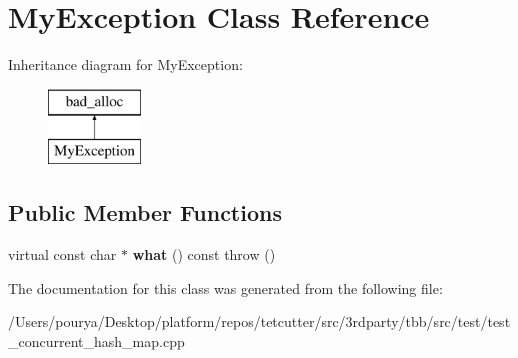 \hypertarget{classMyException}{}\section{My\+Exception Class Reference}
\label{classMyException}
Inheritance diagram for My\+Exception\+:\begin{figure}[H]
\begin{center}
\leavevmode
\includegraphics[height=2.000000cm]{classMyException}
\end{center}
\end{figure}
\subsection*{Public Member Functions}
\begin{DoxyCompactItemize}
\item 
\hypertarget{classMyException_a5f16510641895640d4651f0dec6962a4}{}virtual const char $\ast$ {\bfseries what} () const   throw ()\label{classMyException_a5f16510641895640d4651f0dec6962a4}

\end{DoxyCompactItemize}


The documentation for this class was generated from the following file\+:\begin{DoxyCompactItemize}
\item 
/\+Users/pourya/\+Desktop/platform/repos/tetcutter/src/3rdparty/tbb/src/test/test\+\_\+concurrent\+\_\+hash\+\_\+map.\+cpp\end{DoxyCompactItemize}
